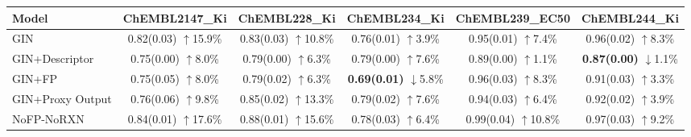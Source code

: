 \begin{table}[t]
\centering
{\small
\setlength{\tabcolsep}{4pt}
\begin{tabular}{l*{5}{c}}
\hline
Model
& ChEMBL2147\_Ki
& ChEMBL228\_Ki
& ChEMBL234\_Ki
& ChEMBL239\_EC50
& ChEMBL244\_Ki \\
\hline
GIN
& \shortstack{0.82(0.03)\\$\uparrow$15.9\%}
& \shortstack{0.83(0.03)\\$\uparrow$10.8\%}
& \shortstack{0.76(0.01)\\$\uparrow$3.9\%}
& \shortstack{0.95(0.01)\\$\uparrow$7.4\%}
& \shortstack{0.96(0.02)\\$\uparrow$8.3\%} \\

GIN+Descriptor
& \shortstack{0.75(0.00)\\$\uparrow$8.0\%}
& \shortstack{0.79(0.00)\\$\uparrow$6.3\%}
& \shortstack{0.79(0.00)\\$\uparrow$7.6\%}
& \shortstack{0.89(0.00)\\$\uparrow$1.1\%}
& \shortstack{\textbf{0.87(0.00)}\\$\downarrow$1.1\%} \\

GIN+FP
& \shortstack{0.75(0.05)\\$\uparrow$8.0\%}
& \shortstack{0.79(0.02)\\$\uparrow$6.3\%}
& \shortstack{\textbf{0.69(0.01)}\\$\downarrow$5.8\%}
& \shortstack{0.96(0.03)\\$\uparrow$8.3\%}
& \shortstack{0.91(0.03)\\$\uparrow$3.3\%} \\

GIN+Proxy Output
& \shortstack{0.76(0.06)\\$\uparrow$9.8\%}
& \shortstack{0.85(0.02)\\$\uparrow$13.3\%}
& \shortstack{0.79(0.02)\\$\uparrow$7.6\%}
& \shortstack{0.94(0.03)\\$\uparrow$6.4\%}
& \shortstack{0.92(0.02)\\$\uparrow$3.9\%} \\

NoFP-NoRXN
& \shortstack{0.84(0.01)\\$\uparrow$17.6\%}
& \shortstack{0.88(0.01)\\$\uparrow$15.6\%}
& \shortstack{0.78(0.03)\\$\uparrow$6.4\%}
& \shortstack{0.99(0.04)\\$\uparrow$10.8\%}
& \shortstack{0.97(0.03)\\$\uparrow$9.2\%} \\


\end{tabular}}
\end{table}
